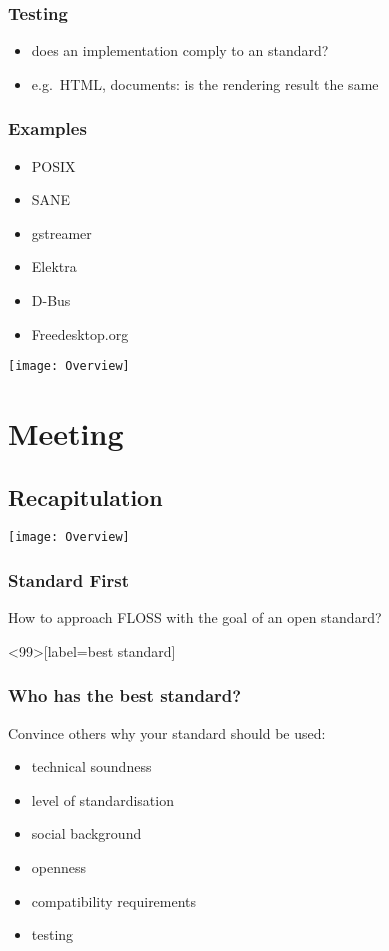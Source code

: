 \begin{frame}
	\frametitle{Testing}

	\begin{itemize}[<+-| alert@+>]
	\item does an implementation comply to an standard?
	\item e.g.\ HTML, documents: is the rendering result the same
	\end{itemize}
\end{frame}

\begin{frame}
	\frametitle{Examples}

	\begin{itemize}[<+-| alert@+>]
	\item POSIX
	\item SANE
	\item gstreamer
	\item Elektra
	\item D-Bus
	\item Freedesktop.org
	\end{itemize}
\end{frame}

\begin{frame}
	\texttt{[image: Overview]}
\end{frame}

\section{Meeting}

\subsection{Recapitulation}

\begin{frame}
	\texttt{[image: Overview]}
\end{frame}


\begin{assignment}
	\frametitle{Standard First}

	How to approach FLOSS with the goal of an open standard?
\end{assignment}


\begin{assignment}<99>[label=best standard]
	\frametitle{Who has the best standard?}

	Convince others why your standard should be used:

	\begin{itemize}[<+-| alert@+>]
	\item technical soundness
	\item level of standardisation
	\item social background
	\item openness
	\item compatibility requirements
	\item testing
	\end{itemize}
\end{assignment}

